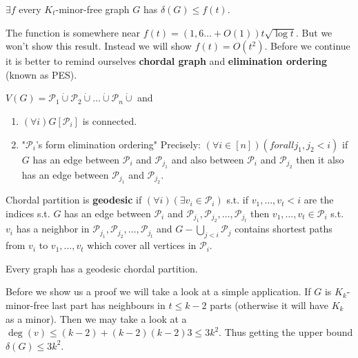 \begin{thm}
	$\exists f$ every $K_{t}$-minor-free graph $G$ has $\delta(G) \leq f(t)$.
\end{thm}

The function is somewhere near $f(t) = (1,6\dots + O(1)) t \sqrt{\log t}$. But we won't show this result. Instead we will show $f(t) = O(t^{2})$. Before we continue it is better to remind ourselves \textbf{chordal graph} and \textbf{elimination ordering} (known as PES).

\begin{defn}
	$V(G) = \mathcal{P}_{1} \dot{\cup} \mathcal{P}_{2} \dot{\cup} \dots \dot{\cup} \mathcal{P}_{n} \dot{\cup}$ and
	
	\begin{enumerate}
		\item $(\forall i) G[\mathcal{P}_{i}]$ is connected.
		\item "$\mathcal{P}_{i}$'s form elimination ordering" Precisely: $(\forall i \in [n])(forall j_{1},j_{2} < i)$ if $G$ has an edge between $\mathcal{P}_{i}$ and $\mathcal{P}_{j_{1}}$ and also between $\mathcal{P}_{i}$ and $\mathcal{P}_{j_{2}}$ then it also has an edge between $\mathcal{P}_{j_{1}}$ and $\mathcal{P}_{j_{2}}$.
	\end{enumerate}
\end{defn}

\begin{defn}
	Chordal partition is \textbf{geodesic} if $(\forall i) (\exists v_{i} \in \mathcal{P}_{i})$ s.t. if $v_{1}, \dots, v_{t} < i$ are the indices s.t. $G$ has an edge between $\mathcal{P}_{i}$ and $\mathcal{P}_{j_{1}}, \mathcal{P}_{j_{2}}, \dots, \mathcal{P}_{j_{t}}$ then $v_{1}, \dots, v_{t} \in \mathcal{P}_{i}$ s.t. $v_{i}$ has a neighbor in $\mathcal{P}_{j_{1}}, \mathcal{P}_{j_{2}}, \dots, \mathcal{P}_{j_{t}}$ and $G - \bigcup_{j < i} \mathcal{P}_{j}$ contains shortest paths from $v_{i}$ to $v_{1}, \dots, v_{t}$ which cover all vertices in $\mathcal{P}_{i}$.
\end{defn}


\begin{thm}
	Every graph has a geodesic chordal partition.
\end{thm}

Before we show us a proof we will take a look at a simple application. If $G$ is $K_{k}$-minor-free last part has neighbours in $t \leq k-2$ parts (otherwise it will have $K_{k}$ as a minor). Then we may take a look at a $\deg(v) \leq (k-2) + (k-2)(k-2)3 \leq 3k^{2}$. Thus getting the upper bound $\delta(G) \leq 3k^{2}$.

